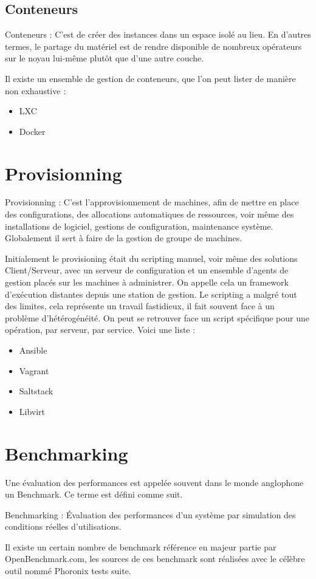 \subsection{Conteneurs}

\begin{mydef}
Conteneurs : C'est de créer des instances dans un espace isolé au lieu. En d'autres termes, le partage du matériel est de rendre disponible de nombreux opérateurs sur le noyau lui-même plutôt que d'une autre couche. 
\end{mydef}

Il existe un ensemble de gestion de conteneurs, que l'on peut lister de manière non exhaustive : 
\begin{itemize}

\item LXC
\item Docker
\end{itemize}
\section{Provisionning}
 
\begin{mydef}
Provisionning : C'est l'approvisionnement de machines, afin de mettre en place des configurations, des allocations automatiques de ressources, voir même des installations de logiciel, gestions de configuration, maintenance système. Globalement il sert à faire de la gestion de groupe de machines. 
\end{mydef}
Initialement le provisioning était du scripting manuel, voir même des solutions Client/Serveur, avec un serveur de configuration et un ensemble d'agents de gestion placés sur les machines à administrer. On appelle cela un framework d’exécution distantes depuis une station de gestion.
Le scripting a malgré tout des limites, cela représente un travail fastidieux, il fait souvent face à un problème d'hétérogénéité. On peut se retrouver face un script spécifique pour une opération, par serveur, par service.
Voici une liste :
\begin{itemize}

\item Ansible
\item Vagrant
\item Saltstack
\item Libvirt
\end{itemize}
\section{Benchmarking}
Une évaluation des performances est appelée souvent dans le monde anglophone un Benchmark. Ce terme est défini comme suit.
\begin{mydef}
Benchmarking : Évaluation des performances d'un système par simulation des conditions réelles d'utilisations. 
\end{mydef}
Il existe un certain nombre de benchmark référence en majeur partie par OpenBenchmark.com, les sources de ces benchmark sont réalisées avec le célèbre outil nommé Phoronix tests suite.

